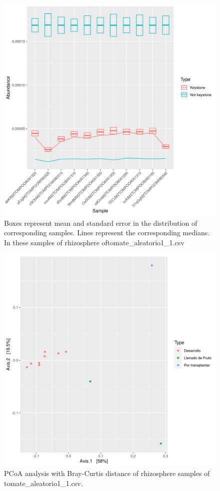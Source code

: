 \begin{figure}
 \centering
 \includegraphics[scale = 0.75]{mean_median_key_vs_not_key_tomate_aleatorio1_1.csv.png}
\caption{Boxes represent mean and standard error in the distribution of corresponding samples. Lines represent the corresponding medians. In these samples of rhizosphere oftomate_aleatorio1_1.csv}
\label{mean_median_tomate_aleatorio1_1.csv}
\end{figure}
\begin{figure}
   \centering
   \includegraphics[scale = 0.7]{pcoa_muestras_tomate_aleatorio1_1.csv.png}
 \caption{PCoA analysis with Bray-Curtis distance of rhizosphere samples of tomate_aleatorio1_1.csv.}
 \label{fig:tomate_aleatorio1_1.csv_pcoa}
\end{figure}
